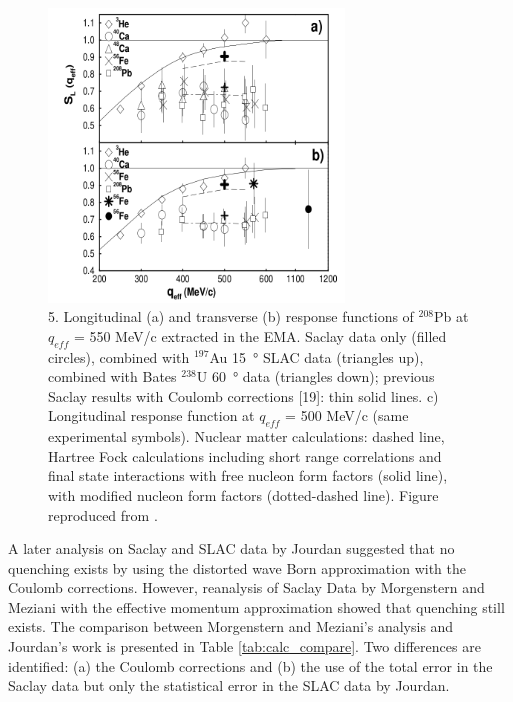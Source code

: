 \begin{figure}[h]
\centering
\includegraphics[width=0.7\textwidth]{figs/S_L_data.png}
\caption[S L data]{
5. Longitudinal (a) and transverse (b) response functions of $^{208}$Pb at
$q_{eff}$ = 550 MeV/c extracted in the EMA. Saclay data only (filled circles), combined with $^{197}$Au \SI{15}{\degree} SLAC data (triangles
up), combined with Bates $^{238}$U \SI{60}{\degree}
data (triangles down); previous Saclay results with Coulomb corrections [19]:
thin solid lines. c) Longitudinal response function at $q_{eff}$ = 500 MeV/c (same
experimental symbols). Nuclear matter calculations: dashed line, Hartree
Fock calculations including short range correlations and final state interactions with free nucleon form factors
(solid line), with modified nucleon
form factors (dotted-dashed line).
Figure reproduced from \cite{Meziani2001}.
\label{fig:S_L_data}}
\end{figure}


A later analysis on Saclay and SLAC data by Jourdan\cite{Jourdan1995} suggested that no quenching
exists by using the distorted wave Born approximation with the Coulomb corrections.
However, reanalysis of Saclay Data by Morgenstern and Meziani\cite{Meziani2001} with the effective
momentum approximation showed that quenching still exists. The comparison between
Morgenstern and Meziani's analysis and Jourdan's work is presented in Table \ref{tab:calc_compare}.
Two differences are identified: (a) the Coulomb corrections and (b) the use of the total error in
the Saclay data but only the statistical error in the SLAC data by Jourdan.

